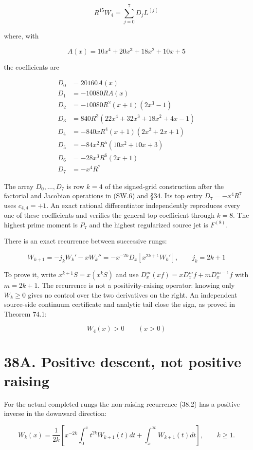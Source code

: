 \documentclass[
  11pt,
]{book}
\begin{document}
\[
\boxed{R^{15}W_4=\sum_{j=0}^{7}D_jL^{(j)}}
\tag{38.1}
\]

where, with

\[
A(x)=10x^4+20x^3+18x^2+10x+5
\]

the coefficients are

\[
\begin{aligned}
D_0&=20160A(x)\\
D_1&=-10080RA(x)\\
D_2&=-10080R^2(x+1)(2x^3-1)\\
D_3&=840R^3(22x^4+32x^3+18x^2+4x-1)\\
D_4&=-840xR^4(x+1)(2x^2+2x+1)\\
D_5&=-84x^2R^5(10x^2+10x+3)\\
D_6&=-28x^3R^6(2x+1)\\
D_7&=-x^4R^7
\end{aligned}
\]

The array \(D_0,\ldots,D_7\) is row \(k=4\) of the signed-grid
construction after the factorial and Jacobian operations in (SW.6) and
§34. Its top entry \(D_7=-x^4R^7\) uses \(c_{4,4}=+1\). An exact
rational differentiator independently reproduces every one of these
coefficients and verifies the general top coefficient through \(k=8\).
The highest prime moment is \(P_7\) and the highest regularized source
jet is \(F^{(8)}\).

There is an exact recurrence between successive rungs:

\[
\boxed{
W_{k+1}=-j_kW_k'-xW_k''
=-x^{-2k}D_x[x^{2k+1}W_k'],\qquad j_k=2k+1
}
\tag{38.2}
\]

To prove it, write \(x^{k+1}S=x(x^kS)\) and use
\(D_x^m(xf)=xD_x^mf+mD_x^{m-1}f\) with \(m=2k+1\). The recurrence is not
a positivity-raising operator: knowing only \(W_k\ge0\) gives no control
over the two derivatives on the right. An independent source-side
continuum certificate and analytic tail close the sign, as proved in
Theorem 74.1:

\[
\boxed{W_4(x)>0\qquad(x>0)}
\]

\section{38A. Positive descent, not positive
raising}\label{a.-positive-descent-not-positive-raising}

For the actual completed rungs the non-raising recurrence (38.2) has a
positive inverse in the downward direction:

\[
\boxed{W_k(x)=\frac1{2k}\left[
 x^{-2k}\int_0^x t^{2k}W_{k+1}(t)dt
 +\int_x^\infty W_{k+1}(t)dt\right],\qquad k\ge1.}
\tag{38A.1}
\]
\end{document}

